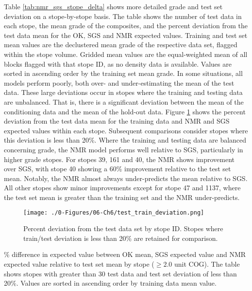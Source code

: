 Table \ref{tab:nmr_sgs_stope_delta} shows more detailed grade and test set deviation on a stope-by-stope basis. The table shows the number of test data in each stope, the mean grade of the composites, and the percent deviation from the test data mean for the \gls{OK}, \gls{SGS} and \gls{NMR} expected values. Training and test set mean values are the declustered mean grade of the respective data set, flagged within the stope volume. Gridded mean values are the equal-weighted mean of all blocks flagged with that stope ID, as no density data is available. Values are sorted in ascending order by the training set mean grade. In some situations, all models perform poorly, both over- and under-estimating the mean of the test data. These large deviations occur in stopes where the training and testing data are unbalanced. That is, there is a significant deviation between the mean of the conditioning data and the mean of the hold-out data. Figure \ref{fig:test_train_deviation} shows the percent deviation from the test data mean for the training data and \gls{NMR} and \gls{SGS} expected values within each stope. Subsequent comparisons consider stopes where this deviation is less than 20\%. Where the training and testing data are balanced concerning grade, the \gls{NMR} model performs well relative to \gls{SGS}, particularly in higher grade stopes. For stopes 39, 161 and 40, the \gls{NMR} shows improvement over \gls{SGS}, with stope 40 showing a 60\% improvement relative to the test set mean. Notably, the \gls{NMR} almost always under-predicts the mean relative to \gls{SGS}. All other stopes show minor improvements except for stope 47 and 1137, where the test set mean is greater than the training set and the \gls{NMR} under-predicts.


\begin{figure}[htb!]
    \centering
    \texttt{[image: ./0-Figures/06-Ch6/test\_train\_deviation.png]}
    \caption{Percent deviation from the test data set by stope ID. Stopes where train/test deviation is less than 20\% are retained for comparison. }
    \label{fig:test_train_deviation}
\end{figure}

\begin{table}[!htb]
    \centering
    \caption{\% difference in expected value between \gls{OK} mean, \gls{SGS} expected value and \gls{NMR} expected value relative to test set mean by stope ($\geq 2.0$ unit \gls{COG}). The table shows stopes with greater than 30 test data and test set deviation of less than 20\%. Values are sorted in ascending order by training data mean value.}
    \resizebox{0.9\width}{!}{}
    \label{tab:nmr_sgs_stope_delta}
\end{table}

